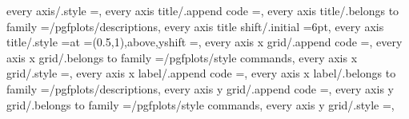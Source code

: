 {{{every axis/.style                                                  ={},                                                                                                                                
every axis title/.append code                                      ={},                                                                           
every axis title/.belongs to family                                =/pgfplots/descriptions,                                                                                                            
every axis title shift/.initial                                    =6pt,                                                                                                                               
every axis title/.style                                            ={at                                                                                                                                ={(0.5,1)},above,yshift                                    =},                                                                      
every axis x grid/.append code                                     ={},                                                                          
every axis x grid/.belongs to family                               =/pgfplots/style commands,                                                                                                          
every axis x grid/.style                                           ={},                                                                                                                                
every axis x label/.append code                                    ={},                                                                         
every axis x label/.belongs to family                              =/pgfplots/descriptions,                                                                                                            
every axis y grid/.append code                                     ={},                                                                          
every axis y grid/.belongs to family                               =/pgfplots/style commands,                                                                                                          
every axis y grid/.style                                           ={},                                                                                                                                
}}}

